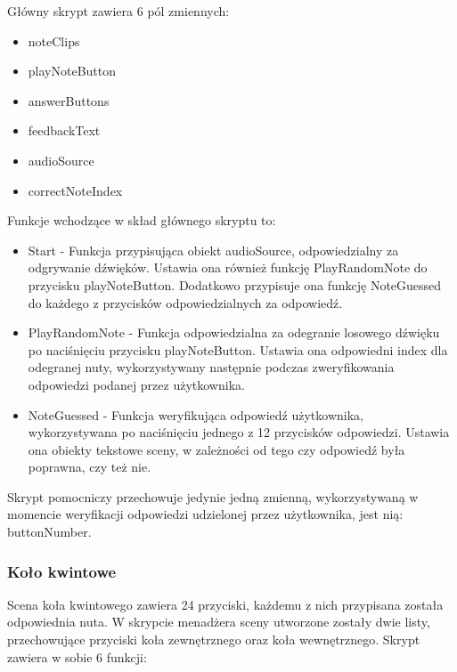 Główny skrypt zawiera 6 pól zmiennych:

\begin{itemize}
    \item noteClips 
    \item playNoteButton  
    \item answerButtons  
    \item feedbackText  
    \item audioSource 
    \item correctNoteIndex
\end{itemize}

Funkcje wchodzące w skład głównego skryptu to:

\begin{itemize}
    \item Start - Funkcja przypisująca obiekt audioSource, odpowiedzialny za odgrywanie dźwięków. Ustawia ona również funkcję PlayRandomNote do przycisku playNoteButton. Dodatkowo przypisuje ona funkcję NoteGuessed do każdego z przycisków odpowiedzialnych za odpowiedź.
    \item PlayRandomNote - Funkcja odpowiedzialna za odegranie losowego dźwięku po naciśnięciu przycisku playNoteButton. Ustawia ona odpowiedni index dla odegranej nuty, wykorzystywany następnie podczas zweryfikowania odpowiedzi podanej przez użytkownika.
    \item NoteGuessed - Funkcja weryfikująca odpowiedź użytkownika, wykorzystywana po naciśnięciu jednego z 12 przycisków odpowiedzi. Ustawia ona obiekty tekstowe sceny, w zależności od tego czy odpowiedź była poprawna, czy też nie. 
\end{itemize}

Skrypt pomocniczy przechowuje jedynie jedną zmienną, wykorzystywaną w momencie weryfikacji odpowiedzi udzielonej przez użytkownika, jest nią: buttonNumber.

\subsubsection{Koło kwintowe}

Scena koła kwintowego zawiera 24 przyciski, każdemu z nich przypisana została odpowiednia nuta. W skrypcie menadżera sceny utworzone zostały dwie listy, przechowujące przyciski koła zewnętrznego oraz koła wewnętrznego. Skrypt zawiera w sobie 6 funkcji:

